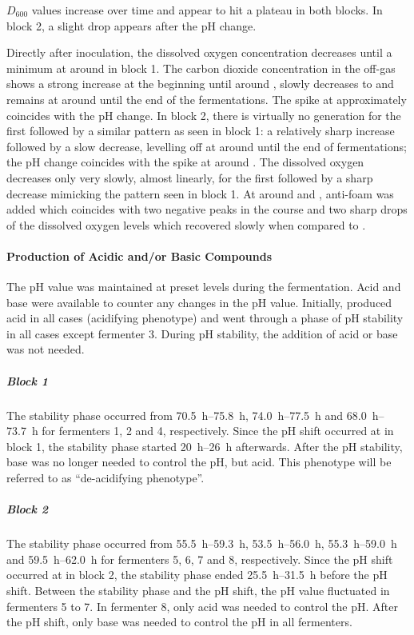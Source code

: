 $D_{600}$ values increase over time and appear to hit a plateau in both blocks. In block 2, a slight drop appears after the pH change.

Directly after inoculation, the dissolved oxygen concentration decreases until a minimum at around  in block 1. The carbon dioxide concentration in the off-gas shows a strong increase at the beginning until around , slowly decreases to and remains at around  until the end of the fermentations. The  spike at approximately  coincides with the pH change.
In block 2, there is virtually no  generation for the first  followed by a similar pattern as seen in block 1: a relatively sharp increase followed by a slow decrease, levelling off at around  until the end of fermentations; the pH change coincides with the  spike at around . The dissolved oxygen decreases only very slowly, almost linearly, for the first  followed by a sharp decrease mimicking the pattern seen in block 1. At around  and , anti-foam was added which coincides with two negative peaks in the  course and two sharp drops of the dissolved oxygen levels which recovered slowly when compared to .

\paragraph{Production of Acidic and/or Basic Compounds}
The pH value was maintained at preset levels during the fermentation. Acid and base were available to counter any changes in the pH value. Initially, \strain{} produced acid in all cases (acidifying phenotype) and went through a phase of pH stability in all cases except fermenter 3. During pH stability, the addition of acid or base was not needed.

\subparagraph{Block 1}
The stability phase occurred from \SIrange{70.5}{75.8}{\hour}, \SIrange{74.0}{77.5}{\hour} and \SIrange{68.0}{73.7}{\hour} for fermenters 1, 2 and 4, respectively. Since the pH shift occurred at  in block 1, the stability phase started \SIrange{20}{26}{\hour} afterwards. After the pH stability, base was no longer needed to control the pH, but acid. This phenotype will be referred to as \enquote{de-acidifying phenotype}.

\subparagraph{Block 2}
The stability phase occurred from \SIrange{55.5}{59.3}{\hour}, \SIrange{53.5}{56.0}{\hour}, \SIrange{55.3}{59.0}{\hour} and \SIrange{59.5}{62.0}{\hour} for fermenters 5, 6, 7 and 8, respectively. Since the pH shift occurred at  in block 2, the stability phase ended \SIrange{25.5}{31.5}{\hour} before the pH shift. Between the stability phase and the pH shift, the pH value fluctuated in fermenters 5 to 7. In fermenter 8, only acid was needed to control the pH. After the pH shift, only base was needed to control the pH in all fermenters.

